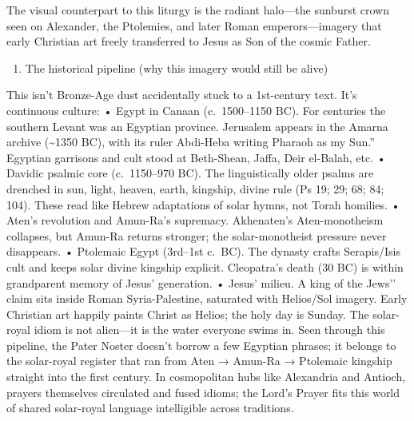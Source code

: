 The visual counterpart to this liturgy is the radiant halo—the sunburst crown seen on Alexander, the Ptolemies, and later Roman emperors—imagery that early Christian art freely transferred to Jesus as Son of the cosmic Father.
\begin{enumerate}
    \def\labelenumi{\arabic{enumi})}
    \setcounter{enumi}{3}
    \item
    The historical pipeline (why this imagery would still be alive)
\end{enumerate}
This isn’t Bronze-Age dust accidentally stuck to a 1st-century text.
It’s continuous culture: • Egypt in Canaan (c.~1500–1150 BC).
For centuries the southern Levant was an Egyptian province.
Jerusalem appears in the Amarna archive (\textasciitilde1350 BC), with its ruler Abdi-Heba writing Pharaoh as my Sun.'' Egyptian garrisons and cult stood at Beth-Shean, Jaffa, Deir el-Balah, etc. • Davidic psalmic core (c.~1150--970 BC). The linguistically older psalms are drenched in sun, light, heaven, earth, kingship, divine rule (Ps 19; 29; 68; 84; 104). These read like Hebrew adaptations of solar hymns, not Torah homilies. • Aten's revolution and Amun-Ra's supremacy. Akhenaten's Aten-monotheism collapses, but Amun-Ra returns stronger; the solar-monotheist pressure never disappears. • Ptolemaic Egypt (3rd--1st c.~BC). The dynasty crafts Serapis/Isis cult and keeps solar divine kingship explicit. Cleopatra's death (30 BC) is within grandparent memory of Jesus' generation. • Jesus' milieu. A king of the Jews’’ claim sits inside Roman Syria-Palestine, saturated with Helios/Sol imagery.
Early Christian art happily paints Christ as Helios; the holy day is Sunday.
The solar-royal idiom is not alien—it is the water everyone swims in.
Seen through this pipeline, the Pater Noster doesn’t borrow a few Egyptian phrases; it belongs to the solar-royal register that ran from Aten → Amun-Ra → Ptolemaic kingship straight into the first century. In cosmopolitan hubs like Alexandria and Antioch, prayers themselves circulated and fused idioms; the Lord’s Prayer fits this world of shared solar-royal language intelligible across traditions.

